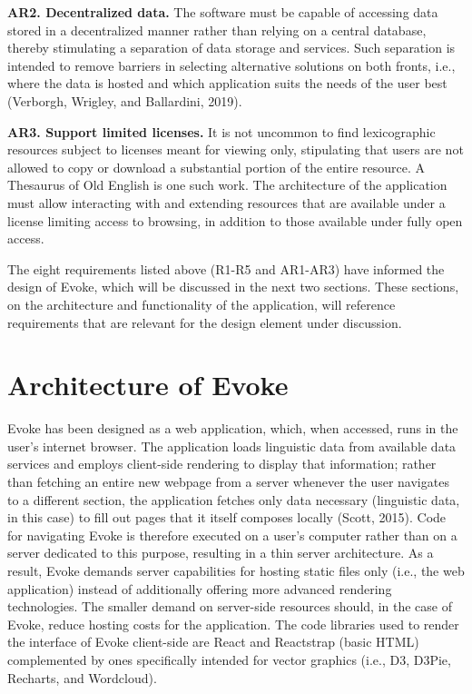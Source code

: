 \textbf{AR2. Decentralized data.} The software must be capable of accessing data stored in a decentralized manner rather than relying on a central database, thereby stimulating a separation of data storage and services. Such separation is intended to remove barriers in selecting alternative solutions on both fronts, i.e., where the data is hosted and which application suits the needs of the user best (Verborgh, Wrigley, and Ballardini, 2019).

\textbf{AR3. Support limited licenses.} It is not uncommon to find lexicographic resources subject to licenses meant for viewing only, stipulating that users are not allowed to copy or download a substantial portion of the entire resource.  A Thesaurus of Old English is one such work. The architecture of the application must allow interacting with and extending resources that are available under a license limiting access to browsing, in addition to those available under fully open access.

The eight requirements listed above (R1-R5 and AR1-AR3) have informed the design of Evoke, which will be discussed in the next two sections. These sections, on the architecture and functionality of the application, will reference requirements that are relevant for the design element under discussion.

\section{Architecture of Evoke}

Evoke has been designed as a web application, which, when accessed, runs in the user’s internet browser. The application loads linguistic data from available data services and employs client-side rendering to display that information; rather than fetching an entire new webpage from a server whenever the user navigates to a different section, the application fetches only data necessary (linguistic data, in this case) to fill out pages that it itself composes locally (Scott, 2015). Code for navigating Evoke is therefore executed on a user’s computer rather than on a server dedicated to this purpose, resulting in a thin server architecture. As a result, Evoke demands server capabilities for hosting static files only (i.e., the web application) instead of additionally offering more advanced rendering technologies. The smaller demand on server-side resources should, in the case of Evoke, reduce hosting costs for the application. The code libraries used to render the interface of Evoke client-side are React and Reactstrap (basic HTML) complemented by ones specifically intended for vector graphics (i.e., D3, D3Pie, Recharts, and Wordcloud).  

